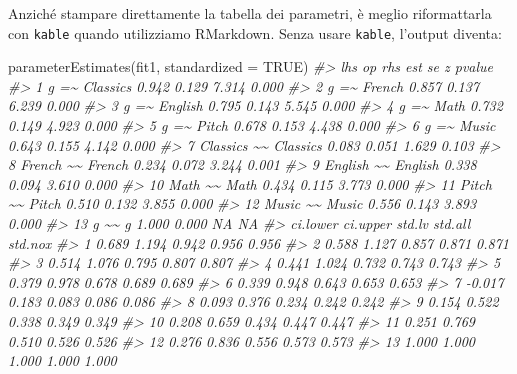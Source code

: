 \documentclass[
  11pt,
]{krantz}
\makeatletter
\newenvironment{Shaded}{\begin{snugshade}}{\end{snugshade}}
\newcommand{\AttributeTok}[1]{\textcolor[rgb]{0.61,0.61,0.61}{#1}}
\newcommand{\CommentTok}[1]{\textcolor[rgb]{0.37,0.37,0.37}{\textit{#1}}}
\newcommand{\ConstantTok}[1]{\textcolor[rgb]{0,0,0}{#1}}
\newcommand{\FunctionTok}[1]{\textcolor[rgb]{0,0,0}{#1}}
\newcommand{\NormalTok}[1]{#1}
\newenvironment{kframe}{%
\medskip{}
\setlength{\fboxsep}{.8em}
 \def\at@end@of@kframe{}%
 \ifinner\ifhmode%
  \def\at@end@of@kframe{\end{minipage}}%
  \begin{minipage}{\columnwidth}%
 \fi\fi%
 \def\FrameCommand##1{\hskip\@totalleftmargin \hskip-\fboxsep
 \colorbox{shadecolor}{##1}\hskip-\fboxsep
     \hskip-\linewidth \hskip-\@totalleftmargin \hskip\columnwidth}%
 \MakeFramed {\advance\hsize-\width
   \@totalleftmargin\z@ \linewidth\hsize
   \@setminipage}}%
 {\par\unskip\endMakeFramed%
 \at@end@of@kframe}
\renewenvironment{Shaded}{\begin{kframe}}{\end{kframe}}
\theoremstyle{definition}
\theoremstyle{definition}
\theoremstyle{definition}
\theoremstyle{definition}
\theoremstyle{remark}
\makeatother
\begin{document}
Anziché stampare direttamente la tabella dei parametri, è meglio riformattarla con \texttt{kable} quando utilizziamo RMarkdown. Senza usare \texttt{kable}, l'output diventa:

\begin{Shaded}
\begin{Highlighting}[]
\FunctionTok{parameterEstimates}\NormalTok{(fit1, }\AttributeTok{standardized =} \ConstantTok{TRUE}\NormalTok{)}
\CommentTok{\#\textgreater{}         lhs op      rhs   est    se     z pvalue}
\CommentTok{\#\textgreater{} 1         g =\textasciitilde{} Classics 0.942 0.129 7.314  0.000}
\CommentTok{\#\textgreater{} 2         g =\textasciitilde{}   French 0.857 0.137 6.239  0.000}
\CommentTok{\#\textgreater{} 3         g =\textasciitilde{}  English 0.795 0.143 5.545  0.000}
\CommentTok{\#\textgreater{} 4         g =\textasciitilde{}     Math 0.732 0.149 4.923  0.000}
\CommentTok{\#\textgreater{} 5         g =\textasciitilde{}    Pitch 0.678 0.153 4.438  0.000}
\CommentTok{\#\textgreater{} 6         g =\textasciitilde{}    Music 0.643 0.155 4.142  0.000}
\CommentTok{\#\textgreater{} 7  Classics \textasciitilde{}\textasciitilde{} Classics 0.083 0.051 1.629  0.103}
\CommentTok{\#\textgreater{} 8    French \textasciitilde{}\textasciitilde{}   French 0.234 0.072 3.244  0.001}
\CommentTok{\#\textgreater{} 9   English \textasciitilde{}\textasciitilde{}  English 0.338 0.094 3.610  0.000}
\CommentTok{\#\textgreater{} 10     Math \textasciitilde{}\textasciitilde{}     Math 0.434 0.115 3.773  0.000}
\CommentTok{\#\textgreater{} 11    Pitch \textasciitilde{}\textasciitilde{}    Pitch 0.510 0.132 3.855  0.000}
\CommentTok{\#\textgreater{} 12    Music \textasciitilde{}\textasciitilde{}    Music 0.556 0.143 3.893  0.000}
\CommentTok{\#\textgreater{} 13        g \textasciitilde{}\textasciitilde{}        g 1.000 0.000    NA     NA}
\CommentTok{\#\textgreater{}    ci.lower ci.upper std.lv std.all std.nox}
\CommentTok{\#\textgreater{} 1     0.689    1.194  0.942   0.956   0.956}
\CommentTok{\#\textgreater{} 2     0.588    1.127  0.857   0.871   0.871}
\CommentTok{\#\textgreater{} 3     0.514    1.076  0.795   0.807   0.807}
\CommentTok{\#\textgreater{} 4     0.441    1.024  0.732   0.743   0.743}
\CommentTok{\#\textgreater{} 5     0.379    0.978  0.678   0.689   0.689}
\CommentTok{\#\textgreater{} 6     0.339    0.948  0.643   0.653   0.653}
\CommentTok{\#\textgreater{} 7    {-}0.017    0.183  0.083   0.086   0.086}
\CommentTok{\#\textgreater{} 8     0.093    0.376  0.234   0.242   0.242}
\CommentTok{\#\textgreater{} 9     0.154    0.522  0.338   0.349   0.349}
\CommentTok{\#\textgreater{} 10    0.208    0.659  0.434   0.447   0.447}
\CommentTok{\#\textgreater{} 11    0.251    0.769  0.510   0.526   0.526}
\CommentTok{\#\textgreater{} 12    0.276    0.836  0.556   0.573   0.573}
\CommentTok{\#\textgreater{} 13    1.000    1.000  1.000   1.000   1.000}
\end{Highlighting}
\end{Shaded}
\end{document}
